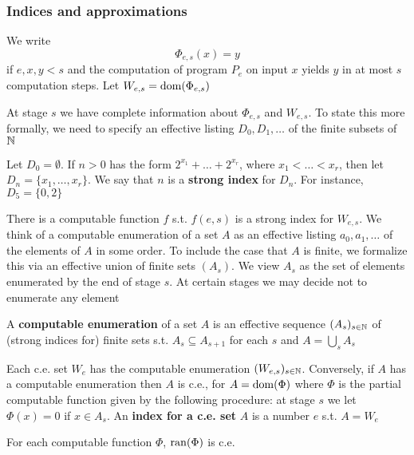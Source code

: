 \documentclass[11pt]{article}
\begin{document}
\subsubsection{Indices and approximations}
\label{sec:org1a89244}
\begin{definition}[]
We write
\begin{equation*}
\Phi_{e,s}(x)=y
\end{equation*}
if \(e,x,y<s\) and the computation of program \(P_e\) on input \(x\) yields \(y\) in at
most \(s\) computation steps. Let \(W_{e,s}=\operatorname{dom}(\Phi_{e,s})\)
\end{definition}

At stage \(s\) we have complete information about \(\Phi_{e,s}\) and \(W_{e,s}\). To state this
more formally, we need to specify an effective listing \(D_0,D_1,\dots\) of the finite subsets of \(\mathbb{N}\)

\begin{definition}[]
Let \(D_0=\emptyset\). If \(n>0\) has the form \(2^{x_1}+\dots+2^{x_r}\), where \(x_1<\dots<x_r\), then
let \(D_n=\{x_1,\dots,x_r\}\). We say that \(n\) is a \textbf{strong index} for \(D_n\). For instance, \(D_5=\{0,2\}\)
\end{definition}

There is a computable function \(f\) s.t. \(f(e,s)\) is a strong index for \(W_{e,s}\). We think
of a computable enumeration of a set \(A\) as an effective listing \(a_0,a_1,\dots\) of the elements
of \(A\) in some order. To include the case that \(A\) is finite, we formalize this via an
effective union of finite sets \((A_s)\). We view \(A_s\) as the set of elements enumerated by
the end of stage \(s\). At certain stages we may decide not to enumerate any element

\begin{definition}[]
A \textbf{computable enumeration} of a set \(A\) is an effective sequence \((A_s)_{s\in\mathbb{N}}\) of (strong
indices for) finite sets s.t. \(A_s\subseteq A_{s+1}\) for each \(s\) and \(A=\bigcup_sA_s\)
\end{definition}

Each c.e. set \(W_e\) has the computable enumeration \((W_{e,s})_{s\in\mathbb{N}}\). Conversely, if \(A\)
has a computable enumeration then \(A\) is c.e., for \(A=\operatorname{dom}(\Phi)\) where \(\Phi\) is the partial
computable function given by the following procedure: at stage \(s\) we let \(\Phi(x)=0\)
if \(x\in A_s\). An \textbf{index for a c.e. set} \(A\) is a number \(e\) s.t. \(A=W_e\)

\begin{proposition}[]
For each computable function \(\Phi\), \(\operatorname{ran}(\Phi)\) is c.e.
\end{proposition}
\end{document}
